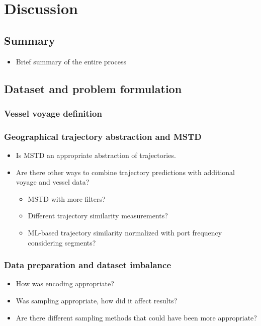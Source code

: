 \chapter{Discussion}
\label{chap:discussion}

\section{Summary}

\begin{itemize}
    \item Brief summary of the entire process
\end{itemize}

\section{Dataset and problem formulation}

\subsection{Vessel voyage definition}

\subsection{Geographical trajectory abstraction and MSTD}
\begin{itemize}
    \item Is MSTD an appropriate abstraction of trajectories.
    \item Are there other ways to combine trajectory predictions with additional voyage and vessel data?
    \begin{itemize}
        \item MSTD with more filters?
        \item Different trajectory similarity measurements?
        \item ML-based trajectory similarity normalized with port frequency considering segments?
    \end{itemize}
\end{itemize}

\subsection{Data preparation and dataset imbalance}
\begin{itemize}
    \item How was encoding appropriate?
    \item Was sampling appropriate, how did it affect results?
    \item Are there different sampling methods that could have been more appropriate?
\end{itemize}

